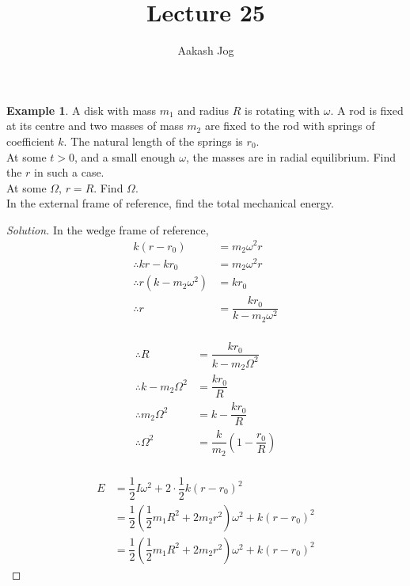 \documentclass[fleqn, a4paper, 12pt]{article}
\title{Lecture 25}
\author{Aakash Jog}
\date{\formatdate{22}{1}{2015}}
\theoremstyle{definition}
\newtheorem{example}{Example}
\theoremstyle{theorem}
\newenvironment{solution}
{\begin{proof}[Solution]\let\qed\relax}
	{\end{proof}}
\begin{document}
\maketitle

\tableofcontents

\newpage
\section{}

\begin{example}
	A disk with mass $m_1$ and radius $R$ is rotating with $\omega$. A rod is fixed at its centre and two masses of mass $m_2$ are fixed to the rod with springs of coefficient $k$. The natural length of the springs is $r_0$.\\
	At some $t > 0$, and a small enough $\omega$, the masses are in radial equilibrium. Find the $r$ in such a case.\\
	At some $\Omega$, $r = R$. Find $\Omega$.\\
	In the external frame of reference, find the total mechanical energy.
\end{example}

\begin{solution}
	In the wedge frame of reference,
	\begin{align*}
		k (r - r_0) &= m_2 \omega^2 r\\
		\therefore k r - k r_0 &= m_2 \omega^2 r\\
		\therefore r (k - m_2 \omega^2) &= k r_0\\
		\therefore r &= \dfrac{k r_0}{k - m_2 \omega^2}
	\end{align*}
	~\\
	\begin{align*}
		\therefore R &= \dfrac{k r_0}{k - m_2 \Omega^2}\\
		\therefore k - m_2 \Omega^2 &= \dfrac{k r_0}{R}\\
		\therefore m_2 \Omega^2 &= k - \dfrac{k r_0}{R}\\
		\therefore \Omega^2 &= \dfrac{k}{m_2} \left( 1 - \dfrac{r_0}{R} \right)
	\end{align*}
	~\\
	\begin{align*}
		E &= \dfrac{1}{2} I \omega^2 + 2 \cdot \dfrac{1}{2} k (r - r_0)^2\\
		&= \dfrac{1}{2} \left( \dfrac{1}{2} m_1 R^2 + 2 m_2 r^2 \right) \omega^2 + k (r - r_0)^2\\
		&= \dfrac{1}{2} \left( \dfrac{1}{2} m_1 R^2 + 2 m_2 r^2 \right) \omega^2 + k (r - r_0)^2
	\end{align*}
\end{solution}
\end{document}
